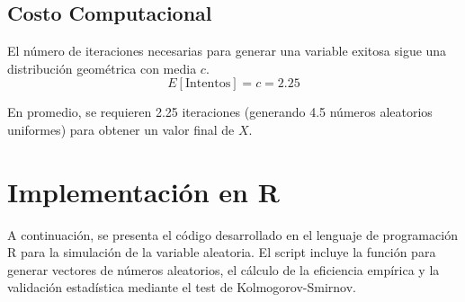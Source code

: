 \documentclass[12pt, a4paper]{article}
\begin{document}
	\subsection{Costo Computacional}
	El número de iteraciones necesarias para generar una variable exitosa sigue una distribución geométrica con media $c$.
	\begin{equation}
		E[\text{Intentos}] = c = 2.25
	\end{equation}
	
	En promedio, se requieren 2.25 iteraciones (generando 4.5 números aleatorios uniformes) para obtener un valor final de $X$.
	
	\section{Implementación en R}
	
	A continuación, se presenta el código desarrollado en el lenguaje de programación R para la simulación de la variable aleatoria. El script incluye la función para generar vectores de números aleatorios, el cálculo de la eficiencia empírica y la validación estadística mediante el test de Kolmogorov-Smirnov.
	
\end{document}

